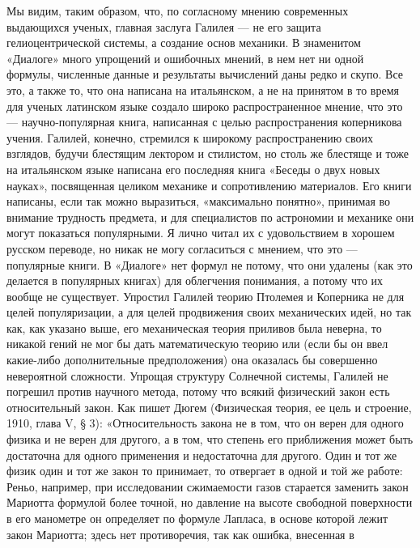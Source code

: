 Мы  видим,  таким  образом,  что,  по  согласному  мнению  современных
выдающихся  ученых,   главная  заслуга  Галилея  ---   не  его  защита
гелиоцентрической  системы, а  создание основ  механики. В  знаменитом
«Диалоге»  много упрощений  и ошибочных  мнений,  в нем  нет ни  одной
формулы, численные данные и результаты  вычислений даны редко и скупо.
Все это, а также то, что она написана на итальянском, а не на принятом
в то время для ученых  латинском языке создало широко распространенное
мнение,  что  это  ---  научно-популярная книга,  написанная  с  целью
распространения  коперникова  учения.  Галилей, конечно,  стремился  к
широкому  распространению своих  взглядов,  будучи блестящим  лектором
и  стилистом,  но  столь  же  блестяще и  тоже  на  итальянском  языке
написана его последняя книга «Беседы о двух новых науках», посвященная
целиком механике и сопротивлению  материалов. Его книги написаны, если
так  можно выразиться,  «максимально  понятно»,  принимая во  внимание
трудность предмета,  и для специалистов  по астрономии и  механике они
могут  показаться популярными.  Я  лично читал  их  с удовольствием  в
хорошем русском переводе, но никак  не могу согласиться с мнением, что
это  --- популярные  книги.  В  «Диалоге» нет  формул  не потому,  что
они  удалены (как  это делается  в популярных  книгах) для  облегчения
понимания,  а потому  что их  вообще не  существует. Упростил  Галилей
теорию Птолемея  и Коперника не  для целей популяризации, а  для целей
продвижения своих механических идей, но так как, как указано выше, его
механическая теория  приливов была  неверна, то  никакой гений  не мог
бы  дать  математическую  теорию  или  (если  бы  он  ввел  какие-либо
дополнительные предположения) она  оказалась бы совершенно невероятной
сложности. Упрощая  структуру Солнечной  системы, Галилей  не погрешил
против  научного  метода,  потому  что всякий  физический  закон  есть
относительный закон.  Как пишет  Дюгем (Физическая  теория, ее  цель и
строение, 1910, глава  V, § 3): «Относительность закона не  в том, что
он  верен для  одного физика  и не  верен для  другого, а  в том,  что
степень его приближения может быть  достаточна для одного применения и
недостаточна для другого. Один  и тот же физик один и  тот же закон то
принимает, то отвергает в одной и  той же работе: Реньо, например, при
исследовании  сжимаемости  газов  старается  заменить  закон  Мариотта
формулой более точной,  но давление на высоте  свободной поверхности в
его манометре он определяет по формуле Лапласа, в основе которой лежит
закон Мариотта;  здесь нет противоречия,  так как ошибка,  внесенная в
